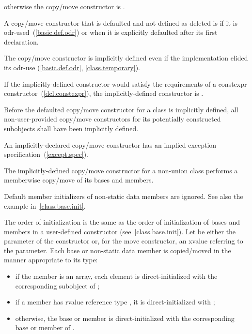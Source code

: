 otherwise the copy/move constructor is
.

\pnum
{}%
%
A copy/move constructor
that is defaulted and not defined as deleted
is
if it is odr-used~(\ref{basic.def.odr})
or when it is explicitly defaulted after its first declaration.
\begin{note}
The copy/move constructor is implicitly defined even if the implementation elided
its odr-use (\ref{basic.def.odr}, \ref{class.temporary}).
\end{note}
If the implicitly-defined constructor would satisfy the requirements of a
constexpr constructor~(\ref{dcl.constexpr}), the implicitly-defined
constructor is .

\pnum
Before the defaulted copy/move constructor for a class is
implicitly defined,
all non-user-provided copy/move constructors for its
potentially constructed subobjects
shall have been implicitly defined.
\begin{note}
An implicitly-declared copy/move constructor has an
implied exception specification~(\ref{except.spec}).
\end{note}

\pnum
The implicitly-defined copy/move constructor for a non-union class
performs a memberwise copy/move of its bases and members.
\begin{note} Default member initializers of non-static data members are ignored. See also the example in~\ref{class.base.init}. \end{note}
The order of initialization is the same as the order of initialization of bases
and members in a user-defined constructor (see~\ref{class.base.init}).
Let  be either the parameter of the constructor or, for the move constructor, an
xvalue referring to the parameter.
Each base or non-static data member
is copied/moved in the manner appropriate to its type:

\begin{itemize}
\item
if the member is an array, each element is
direct-initialized with the corresponding subobject of ;

\item
if a member  has rvalue reference type , it is direct-initialized with
;

\item
otherwise, the base or member is direct-initialized with the corresponding base or member of .
\end{itemize}

